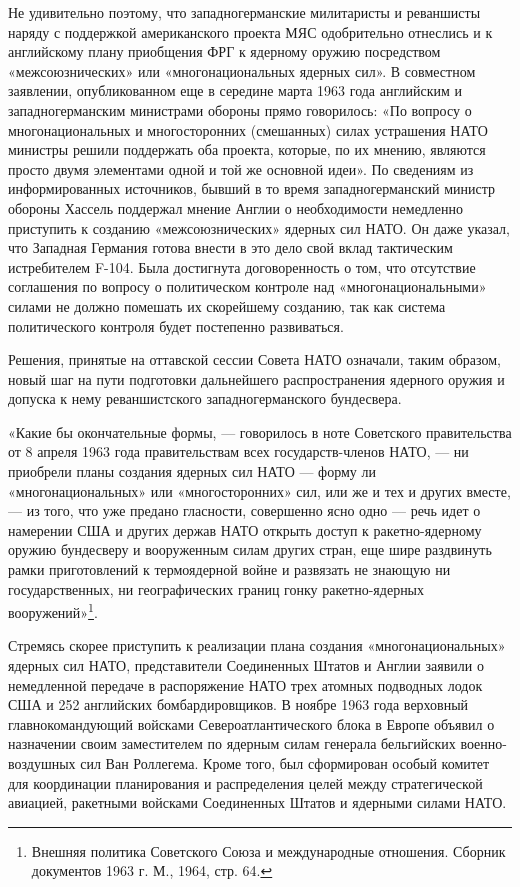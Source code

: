 \documentclass[12pt, a4paper, openany]{book}
\begin{document}
Не удивительно поэтому, что западногерманские милитаристы и реваншисты наряду с поддержкой американского проекта МЯС одобрительно отнеслись и к английскому плану приобщения ФРГ к ядерному оружию посредством «межсоюзнических» или «многонациональных ядерных сил». В совместном заявлении, опубликованном еще в середине марта 1963 года английским и западногерманским министрами обороны прямо говорилось: «По вопросу о многонациональных и многосторонних (смешанных) силах устрашения НАТО министры решили поддержать оба проекта, которые, по их мнению, являются просто двумя элементами одной и той же основной идеи». По сведениям из информированных источников, бывший в то время западногерманский министр обороны Хассель поддержал мнение Англии о необходимости немедленно приступить к созданию «межсоюзнических» ядерных сил НАТО. Он даже указал, что Западная Германия готова внести в это дело свой вклад тактическим истребителем F-104. Была достигнута договоренность о том, что отсутствие соглашения по вопросу о политическом контроле над «многонациональными» силами не должно помешать их скорейшему созданию, так как система политического контроля будет постепенно развиваться.
	

Решения, принятые на оттавской сессии Совета НАТО означали, таким образом, новый шаг на пути подготовки дальнейшего распространения ядерного оружия и допуска к нему реваншистского западногерманского бундесвера.

«Какие бы окончательные формы, — говорилось в ноте Советского правительства от 8 апреля 1963 года правительствам всех государств-членов НАТО, — ни приобрели планы создания ядерных сил НАТО — форму ли «многонациональных» или «многосторонних» сил, или же и тех и других вместе, — из того, что уже предано гласности, совершенно ясно одно — речь идет о намерении США и других держав НАТО открыть доступ к ракетно-ядерному оружию бундесверу и вооруженным силам других стран, еще шире раздвинуть рамки приготовлений к термоядерной войне и развязать не знающую ни государственных, ни географических границ гонку ракетно-ядерных вооружений»{\footnote{Внешняя политика Советского Союза и международные отношения. Сборник документов 1963 г. М., 1964, стр. 64.}}.

	
	Стремясь скорее приступить к реализации плана создания «многонациональных» ядерных сил НАТО, представители Соединенных Штатов и Англии заявили о немедленной передаче в распоряжение НАТО трех атомных подводных лодок США и 252 английских бомбардировщиков. В ноябре 1963 года верховный главнокомандующий войсками Североатлантического блока в Европе объявил о назначении своим заместителем по ядерным силам генерала бельгийских военно-воздушных сил Ван Роллегема. Кроме того, был сформирован особый комитет для координации планирования и распределения целей между стратегической авиацией, ракетными войсками Соединенных Штатов и ядерными силами НАТО.
	
\end{document}
